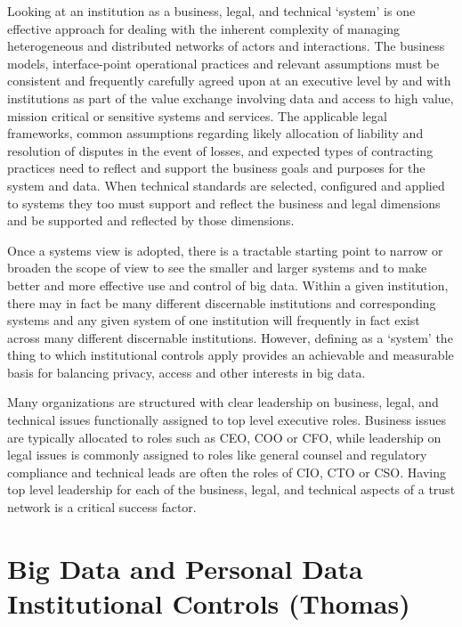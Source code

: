 Looking at an institution as a business, legal, and technical `system' is one effective approach for dealing with the inherent complexity of managing heterogeneous and distributed networks of actors and interactions.
The business models, interface-point operational practices and relevant assumptions must be consistent and frequently carefully agreed upon at an executive level by and with institutions as part of the value exchange involving data and access to high value, mission critical or sensitive systems and services.
The applicable legal frameworks, common assumptions regarding likely allocation of liability and resolution of disputes in the event of losses, and expected types of contracting practices need to reflect and support the business goals and purposes for the system and data.
When technical standards are selected, configured and applied to systems they too must support and reflect the business and legal dimensions and be supported and reflected by those dimensions.

Once a systems view is adopted, there is a tractable starting point to narrow or broaden the scope of view to see the smaller and larger systems and to make better and more effective use and control of big data.
Within a given institution, there may in fact be many different discernable institutions and corresponding systems and any given system of one institution will frequently in fact exist across many different discernable institutions. 
However, defining as a `system' the thing to which institutional controls apply provides an achievable and measurable basis for balancing privacy, access and other interests in big data.

Many organizations are structured with clear leadership on business, legal, and technical issues functionally assigned to top level executive roles.  Business issues are typically allocated to roles such as CEO, COO or CFO, while leadership on legal issues is commonly assigned to roles like general counsel and regulatory compliance and technical leads are often the roles of CIO, CTO or CSO. Having top level leadership for each of the business, legal, and technical aspects of a trust network is a critical success factor. 


\section{Big Data and Personal Data Institutional Controls (Thomas)}

